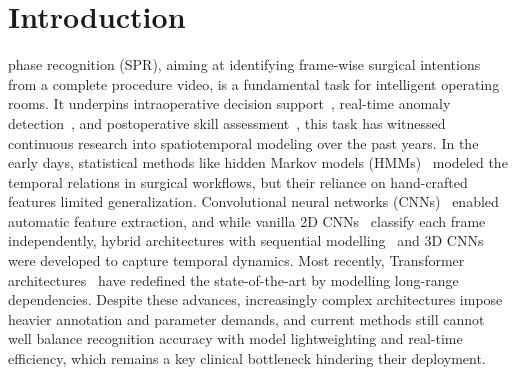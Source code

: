 \section{Introduction}
\label{sec:introduction}




 phase recognition (SPR), aiming at identifying
frame-wise surgical intentions from a complete procedure video, is a
fundamental task for intelligent operating rooms. It underpins intraoperative decision
support~\cite{vermeulen2023ultra}, real-time anomaly detection~\cite{mithany2023advancements},
and postoperative skill assessment~\cite{cao2023intelligent}, this task has witnessed continuous
research into spatiotemporal modeling over the past years.
In the early days, statistical methods like hidden Markov models
(HMMs)~\cite{blum2008modeling, padoy2012statistical} modeled the temporal relations in surgical
workflows, but their reliance on hand-crafted features limited generalization.
Convolutional neural networks (CNNs)~\cite{krizhevsky2012imagenet} enabled automatic feature
extraction, and while vanilla 2D CNNs~\cite{primus2018frame} classify each frame independently,
hybrid architectures with sequential modelling~\cite{yengera2018less, zisimopoulos2018deepphase}
and 3D CNNs~\cite{czempiel2020tecno} were developed to capture temporal dynamics.
Most recently, Transformer architectures~\cite{yang2024surgformer} have redefined the
state-of-the-art by modelling long-range dependencies.
Despite these advances, increasingly complex architectures impose heavier annotation and parameter demands, and current methods still cannot well
balance recognition accuracy with model lightweighting and real-time efficiency, which remains a
key clinical bottleneck hindering their deployment.


